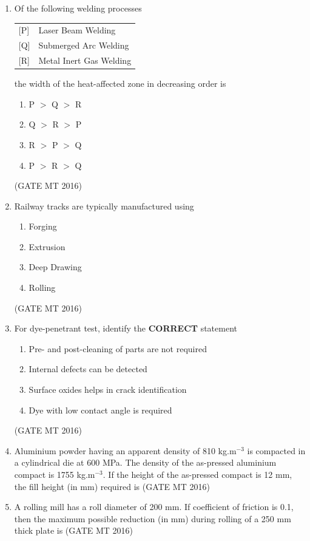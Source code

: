 \documentclass[journal, 11pt, onecolumn]{IEEEtran}
\theoremstyle{remark}
\begin{document}
\begin{enumerate}
\item Of the following welding processes  

\begin{tabular}{ll}
{[P]} & Laser Beam Welding \\
{[Q]} & Submerged Arc Welding \\
{[R]} & Metal Inert Gas Welding \\
\end{tabular}

the width of the heat-affected zone in decreasing order is
\begin{enumerate}
\item P $>$ Q $>$ R
\item Q $>$ R $>$ P
\item R $>$ P $>$ Q
\item P $>$ R $>$ Q
\end{enumerate}
\hfill(GATE MT 2016)

\item Railway tracks are typically manufactured using
\begin{multicols}{4}
\begin{enumerate}
\item Forging
\item Extrusion
\item Deep Drawing
\item Rolling
\end{enumerate}   
\end{multicols}
\hfill(GATE MT 2016)


\item For dye-penetrant test, identify the \textbf{CORRECT} statement
\begin{enumerate}
\item Pre- and post-cleaning of parts are not required
\item Internal defects can be detected
\item Surface oxides helps in crack identification
\item Dye with low contact angle is required
\end{enumerate}
\hfill(GATE MT 2016)

\item Aluminium powder having an apparent density of 810 kg.m$^{-3}$ is compacted in a cylindrical die at 600 MPa. The density of the as-pressed aluminium compact is 1755 kg.m$^{-3}$. If the height of the as-pressed compact is 12 mm, the fill height (in mm) required is 
\hfill(GATE MT 2016)

\item A rolling mill has a roll diameter of 200 mm. If coefficient of friction is 0.1, then the maximum possible reduction (in mm) during rolling of a 250 mm thick plate is 
\hfill(GATE MT 2016)


\end{enumerate}
\end{document}
